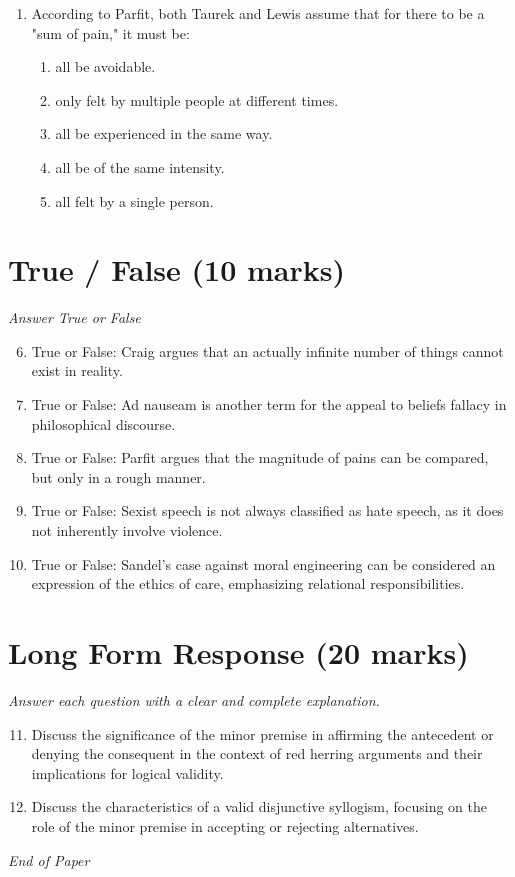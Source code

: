 \documentclass[12pt]{article}
\begin{document}
\begin{enumerate}[label=\arabic*.]
\begin{enumerate}[label=(\alph*)]
    \item Papadaki argues that sexual objectification is an outdated concept.
    \item sexual objectification actually enhances humanity.
    \item Papadaki believes that sexual objectification is a necessary part of human relationships.
\end{enumerate}
\item According to Parfit, both Taurek and Lewis assume that for there to be a "sum of pain," it must be:
\begin{enumerate}[label=(\alph*)]
    \item all be avoidable.
    \item only felt by multiple people at different times.
    \item all be experienced in the same way.
    \item all be of the same intensity.
    \item all felt by a single person.
\end{enumerate}
\end{enumerate}

\section*{True / False (10 marks)}
\textit{Answer True or False}
\begin{enumerate}[label=\arabic*.]
\setcounter{enumi}{5}
\item True or False: Craig argues that an actually infinite number of things cannot exist in reality.
\item True or False: Ad nauseam is another term for the appeal to beliefs fallacy in philosophical discourse.
\item True or False: Parfit argues that the magnitude of pains can be compared, but only in a rough manner.
\item True or False: Sexist speech is not always classified as hate speech, as it does not inherently involve violence.
\item True or False: Sandel's case against moral engineering can be considered an expression of the ethics of care, emphasizing relational responsibilities.
\end{enumerate}

\section*{Long Form Response (20 marks)}
\textit{Answer each question with a clear and complete explanation.}
\begin{enumerate}[label=\arabic*.]
\setcounter{enumi}{10}
\item Discuss the significance of the minor premise in affirming the antecedent or denying the consequent in the context of red herring arguments and their implications for logical validity.
\item Discuss the characteristics of a valid disjunctive syllogism, focusing on the role of the minor premise in accepting or rejecting alternatives.
\end{enumerate}

\vfill
\noindent\textit{End of Paper}
\end{document}

